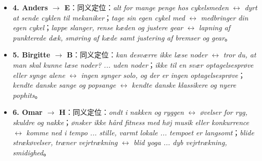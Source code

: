 \begin{itemize}
  \item \textbf{4. Anders $\rightarrow$ E}：同义定位：\textit{alt for mange penge hos cykelsmeden} $\leftrightarrow$ \textit{dyrt at sende cyklen til mekaniker}；\textit{tage sin egen cykel med} $\leftrightarrow$ \textit{medbringer din egen cykel}；\textit{lappe slanger, rense kæden og justere gear} $\leftrightarrow$ \textit{lapning af punkterede dæk, smøring af kæde samt justering af bremser og gear}。
  \item \textbf{5. Birgitte $\rightarrow$ B}：同义定位：\textit{kan desværre ikke læse noder} $\leftrightarrow$ \textit{tror du, at man skal kunne læse noder? ... uden noder}；\textit{ikke til en svær optagelsesprøve eller synge alene} $\leftrightarrow$ \textit{ingen synger solo, og der er ingen optagelsesprøve}；\textit{kendte danske sange og popsange} $\leftrightarrow$ \textit{kendte danske klassikere og nyere pophits}。
  \item \textbf{6. Omar $\rightarrow$ H}：同义定位：\textit{ondt i nakken og ryggen} $\leftrightarrow$ \textit{øvelser for ryg, skuldre og nakke}；\textit{ønsker ikke hård fitness med høj musik eller konkurrence} $\leftrightarrow$ \textit{komme ned i tempo ... stille, varmt lokale ... tempoet er langsomt}；\textit{blide strækøvelser, træner vejrtrækning} $\leftrightarrow$ \textit{blid yoga ... dyb vejrtrækning, smidighed}。
\end{itemize}

